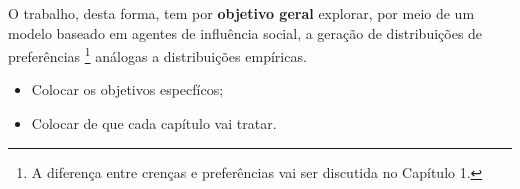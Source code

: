 O trabalho, desta forma, tem por \textbf{objetivo geral} explorar, por meio
de um modelo baseado em agentes de influência social, a geração de distribuições
de preferências \footnote{A diferença entre crenças e preferências vai ser
discutida no Capítulo 1.} análogas a distribuições empíricas.




\begin{tcolorbox}[{colback=yellow!10!white,
colframe=yellow!75!black}]
\begin{itemize}
\item Colocar os objetivos especfícos;
\item Colocar de que cada capítulo vai tratar.
\end{itemize}
\end{tcolorbox}




